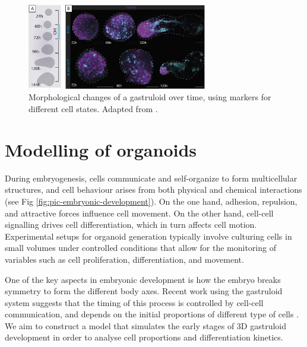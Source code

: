 \vspace{1em}

\begin{figure}[hb]
    \centering
    \includegraphics[width=0.7\textwidth]{figures/picture-gastruloid.png}
    \caption{Morphological changes of a gastruloid over time, using markers for different cell states. Adapted from \cite{Cooke_2023}.}
    \label{fig:pic-gastruloid}
\end{figure}



\section{Modelling of organoids}

During embryogenesis, cells communicate and self-organize to form multice\-llular structures, and cell behaviour arises from both physical and chemical in\-te\-rac\-tions (see Fig \ref{fig:pic-embryonic-development}). On the one hand, adhesion, repulsion, and attractive forces influence cell movement. On the other hand, cell-cell signalling drives cell di\-ffe\-ren\-tia\-tion, which in turn affects cell motion. Experimental setups for or\-ga\-noid generation typically involve culturing cells in small volumes under controlled conditions that allow for the monitoring of variables such as cell proliferation, differentiation, and movement. 

One of the key aspects in embryonic development is how the embryo breaks symmetry to form the different body axes. Recent work using the gastruloid system suggests that the timing of this process is controlled by cell-cell communication, and depends on the initial proportions of different type of cells \linebreak \parencite{Oriola_2025}. We aim to construct a model that si\-mu\-lates the early stages of 3D gastruloid development in order to ana\-lyse cell proportions and differentiation kinetics.

\vspace{1em}

